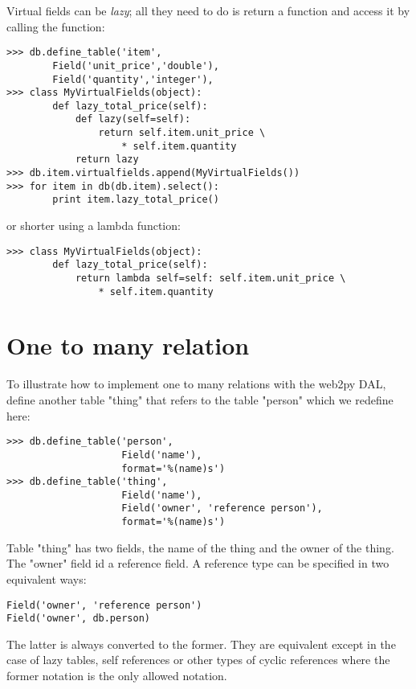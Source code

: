 \documentclass[justified,sixbynine,notoc]{tufte-book}
\def\inxx#1{\index{#1}}
\begin{document}
\begin{fullwidth}
Virtual fields can be {\it lazy}; all they need to do is return a function and access it by calling the function:
\begin{lstlisting}
>>> db.define_table('item',
        Field('unit_price','double'),
        Field('quantity','integer'),
>>> class MyVirtualFields(object):
        def lazy_total_price(self):
            def lazy(self=self):
                return self.item.unit_price \
                    * self.item.quantity
            return lazy
>>> db.item.virtualfields.append(MyVirtualFields())
>>> for item in db(db.item).select():
        print item.lazy_total_price()
\end{lstlisting}
\noindent or shorter using a lambda function:
\begin{lstlisting}
>>> class MyVirtualFields(object):
        def lazy_total_price(self):
            return lambda self=self: self.item.unit_price \
                * self.item.quantity
\end{lstlisting}

\goodbreak\section{One to many relation}

\inxx{one to many}

To illustrate how to implement one to many relations with the web2py DAL, define another table "thing" that refers to the table "person" which we redefine here:
\begin{lstlisting}
>>> db.define_table('person',
                    Field('name'),
                    format='%(name)s')
>>> db.define_table('thing',
                    Field('name'),
                    Field('owner', 'reference person'),
                    format='%(name)s')
\end{lstlisting}

Table "thing" has two fields, the name of the thing and the owner of the thing. The "owner" field id a reference field. A reference type can be specified in two equivalent ways:

\begin{lstlisting}
Field('owner', 'reference person')
Field('owner', db.person)
\end{lstlisting}

The latter is always converted to the former. They are equivalent except in the case of lazy tables, self references or other types of cyclic references where the former notation is the only allowed notation.


\end{fullwidth}
\end{document}
